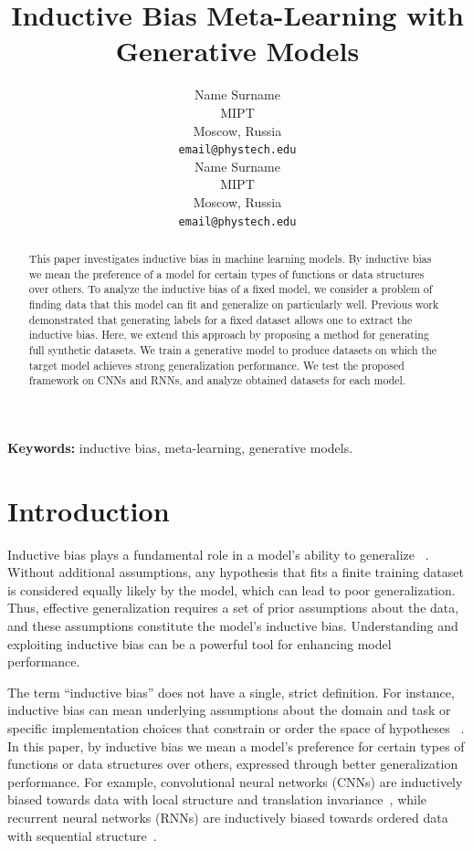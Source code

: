 \documentclass{article}
\title{Inductive Bias Meta-Learning with Generative Models}
\author{
  Name Surname\\
  MIPT\\
  Moscow, Russia\\
  \texttt{email@phystech.edu}\\
  \And
  Name Surname\\
  MIPT\\
  Moscow, Russia\\
  \texttt{email@phystech.edu}\\
}
\begin{document}
\maketitle

\begin{abstract}
    This paper investigates inductive bias in machine learning models. By inductive bias we mean the preference of a model for certain types of functions or data structures over others. To analyze the inductive bias of a fixed model, we consider a problem of finding data that this model can fit and generalize on particularly well. Previous work demonstrated that generating labels for a fixed dataset allows one to extract the inductive bias. Here, we extend this approach by proposing a method for generating full synthetic datasets. We train a generative model to produce datasets on which the target model achieves strong generalization performance. We test the proposed framework on CNNs and RNNs, and analyze obtained datasets for each model.
\end{abstract}

\textbf{Keywords:} inductive bias, meta-learning, generative models.

\section{Introduction}\label{sec:intro}

Inductive bias plays a fundamental role in a model’s ability to generalize ~\cite{mitchell1980need}. Without additional assumptions, any hypothesis that fits a finite training dataset is considered equally likely by the model, which can lead to poor generalization. Thus, effective generalization requires a set of prior assumptions about the data, and these assumptions constitute the model’s inductive bias. Understanding and exploiting inductive bias can be a powerful tool for enhancing model performance.

The term “inductive bias” does not have a single, strict definition. For instance, inductive bias can mean underlying assumptions about the domain and task or specific implementation choices that constrain or order the space of hypotheses ~\cite{provost1995inductive}. In this paper, by inductive bias we mean a model's preference for certain types of functions or data structures over others, expressed through better generalization performance. For example, convolutional neural networks (CNNs) are inductively biased towards data with local structure and translation invariance~\cite{726791, wang2024theoreticalanalysisinductivebiases, cohen2017inductivebiasdeepconvolutional}, while recurrent neural networks (RNNs) are inductively biased towards ordered data with sequential structure~\cite{lstm, ishii2023empiricalanalysisinductivebias,DUBININ2024106179}.
\end{document}
